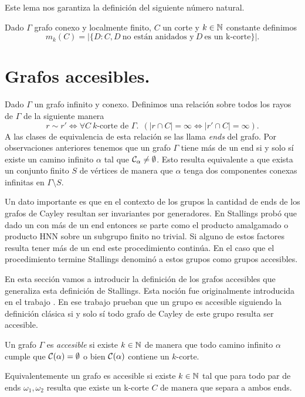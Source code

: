 \documentclass[tesis.tex]{subfiles}
\begin{document}
Este lema nos garantiza la definición del siguiente número natural.

\begin{deff}
	Dado $\Gamma$ grafo conexo y localmente finito, $C$ un corte y $k \in \mathbb{N}$ constante definimos
	\[
	m_k(C) = | \{  D : C, D \ \text{no están anidados y} \ D \ \text{es un k-corte}   \} |. 
	\]
\end{deff}


\section{Grafos accesibles.}

Dado $\Gamma$ un grafo infinito y conexo.
Definimos una relación sobre todos los rayos de $\Gamma$ de la siguiente manera
\[
r \sim r' \iff \forall C \ \text{$k$-corte de $\Gamma$}. \ \ 
(|r \cap C| = \infty \iff |r' \cap C| = \infty). 
\]
A las clases de equivalencia de esta relación se las llama \emph{ends} del grafo.
Por observaciones anteriores tenemos que un grafo $\Gamma$ tiene más de un end si y solo sí existe un camino infinito $\alpha$ tal que ${\cal C}_{\alpha} \neq \emptyset$.
Esto resulta equivalente a que exista un conjunto finito $S$ de vértices de manera que $\alpha$ tenga dos componentes conexas infinitas en $\Gamma \setminus S$.

Un dato importante es que en el contexto de los grupos la cantidad de ends de los grafos de Cayley resultan ser invariantes por generadores.
En \cite{stallings1971group} Stallings probó que dado un \fg con más de un end entonces se parte como el producto amalgamado o producto HNN sobre un subgrupo finito no trivial.
Si alguno de estos factores resulta tener más de un end este procedimiento continúa.
En el caso que el procedimiento termine Stallings denominó a estos grupos como grupos accesibles. 

En esta sección vamos a introducir la definición de los grafos accesibles que generaliza esta definición de Stallings.
Esta noción fue originalmente introducida en el trabajo \cite{thomassen1993vertex}.
En ese trabajo prueban que un grupo es accesible siguiendo la definición clásica si y solo sí todo grafo de Cayley de este grupo resulta ser accesible.
\begin{deff}
	Un grafo $\Gamma$ es \emph{accesible} si existe $k \in \mathbb{N}$ de manera que todo camino infinito $\alpha$ cumple que ${\cal C}(\alpha) = \emptyset$ o bien ${\cal C}(\alpha)$ contiene un $k$-corte.
\end{deff}
Equivalentemente un grafo es accesible si existe $k \in \mathbb{N}$ tal que para todo par de ends $\omega_1, \omega_2$ resulta que existe un k-corte $C$ de manera que separa a ambos ends.
\end{document}
